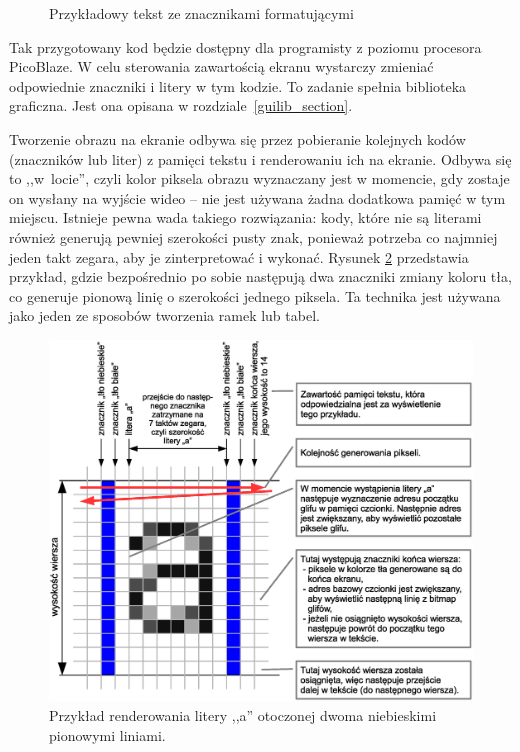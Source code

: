 \begin{figure}[htb]	
	\centering
	\setlength{\fboxsep}{0pt}
	\setlength{\fboxrule}{0.5pt}
	\caption{Przykładowy tekst ze znacznikami formatującymi}
	\label{ftExample}
\end{figure}

Tak przygotowany kod będzie dostępny dla programisty z poziomu procesora PicoBlaze. W celu sterowania zawartością ekranu wystarczy zmieniać odpowiednie znaczniki i litery w tym kodzie. To zadanie spełnia biblioteka graficzna. Jest ona opisana w rozdziale~\ref{guilib_section}.

Tworzenie obrazu na ekranie odbywa się przez pobieranie kolejnych kodów (znaczników lub liter) z pamięci tekstu i renderowaniu ich na ekranie. Odbywa się to ,,w~locie'', czyli kolor piksela obrazu wyznaczany jest w momencie, gdy zostaje on wysłany na wyjście wideo -- nie jest używana żadna dodatkowa pamięć w tym miejscu. Istnieje pewna wada takiego rozwiązania: kody, które nie są literami również generują pewniej szerokości pusty znak, ponieważ potrzeba co najmniej jeden takt zegara, aby je zinterpretować i wykonać. Rysunek \ref{renderExample} przedstawia przykład, gdzie bezpośrednio po sobie następują dwa znaczniki zmiany koloru tła, co generuje pionową linię o szerokości jednego piksela. Ta technika jest używana jako jeden ze sposobów tworzenia ramek lub tabel.

\begin{figure}[htb]	
	\centering
	\includegraphics[width=14cm]{obrazki/renderExample.eps}
	\caption{ Przykład renderowania litery ,,a'' otoczonej dwoma niebieskimi pionowymi liniami. }
	\label{renderExample}
\end{figure}

